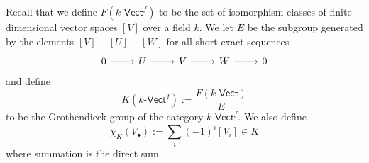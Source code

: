 \documentclass[../../master.tex]{subfiles}
\begin{document}
\begin{solution}
    Recall that we define $F(k\text{-}\mathsf{Vect}^{f})$ to be the set of isomorphism classes of finite-dimensional vector spaces $[V]$ over a field $k$.
    We let $E$ be the subgroup generated by the elements $[V] - [U] - [W]$ for all short exact sequences
    \[
    \begin{tikzcd}
        0 & U & V & W & 0
        \arrow[from=1-1, to=1-2] 
        \arrow[from=1-2, to=1-3] 
        \arrow[from=1-3, to=1-4] 
        \arrow[from=1-4, to=1-5] 
    \end{tikzcd}
    \]
    and define
    \[
        K(k\text{-}\mathsf{Vect}^{f}) := \frac{F(k\text{-}\mathsf{Vect})}{E}
    \]
    to be the Grothendieck group of the category $k\text{-}\mathsf{Vect}^{f}$.
    We also define
    \[
        \chi_K(V_{\bullet}) := \sum_i (-1)^{i} [V_i] \in K
    \]
    where summation is the direct sum.


\end{solution}
\end{document}
